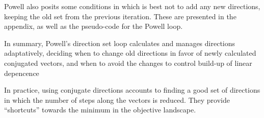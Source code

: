 Powell also posits some conditions in which is best not to add any new directions, keeping the old set from the previous iteration. These are presented in the appendix, as well as the pseudo-code for the Powell loop.

In summary, Powell's direction set loop calculates and manages directions adaptatively, deciding when to change old directions in favor of newly calculated conjugated vectors, and when to avoid the changes to control build-up of linear depencence

In practice, using conjugate directions accounts to finding a good set of directions in which the number of steps along the vectors is reduced. They provide ``shortcuts'' towards the minimum in the objective landscape.
